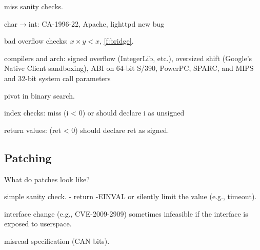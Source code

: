 miss sanity checks.

char$\to$int: 
CA-1996-22,
Apache,
lighttpd new bug

bad overflow checks: $x \times y < x$, 
\autoref{f:bridge}.

compilers and arch:
signed overflow (IntegerLib, etc.),
oversized shift (Google's Native Client sandboxing),
ABI on 64-bit S/390, PowerPC, SPARC, and MIPS
and 32-bit system call parameters~\cite[CVE-2009-0029]{cve}

pivot in binary search.

index checks:
miss (i < 0) or should declare i as unsigned

return values: (ret < 0)
should declare ret as signed.

\subsection{Patching}

What do patches look like?

simple sanity check.
- return -EINVAL or silently limit the value (e.g., timeout).

interface change (e.g., CVE-2009-2909)
sometimes infeasible if the interface is exposed to userspace.

misread specification (CAN bits).


